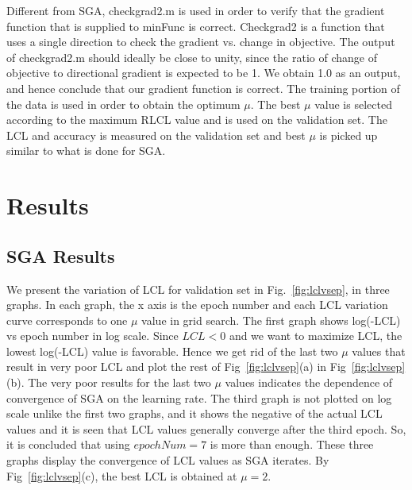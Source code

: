 \documentclass[a4paper]{article}
\begin{document}
Different from SGA, checkgrad2.m \cite{Label5} is used in order to verify that the gradient function that is supplied to minFunc is correct. Checkgrad2 is a function that uses a single direction to check the gradient vs. change in objective. The output of checkgrad2.m should ideally be close to unity, since the ratio of change of objective to directional gradient is expected to be 1. We obtain 1.0 as an output, and hence conclude that our gradient function is correct. The training portion of the data is used in order to obtain the optimum $\mu$. The best $\mu$ value is selected according to the maximum RLCL value and is used on the validation set. The LCL and accuracy is measured on the validation set and best $\mu$ is picked up similar to what is done for SGA.

\section{Results}

\subsection{SGA Results}

We present the variation of LCL for validation set in Fig.~\ref{fig:lclvsep}, in three graphs. In each graph, the x axis is the epoch number and each LCL variation curve corresponds to one $\mu$ value in grid search. The first graph shows log(-LCL) vs epoch number in log scale. Since $LCL < 0$ and we want to maximize LCL, the lowest log(-LCL) value is favorable. Hence we get rid of the last two $\mu$ values that result in very poor LCL and plot the rest of Fig~\ref{fig:lclvsep}(a) in Fig~\ref{fig:lclvsep}(b). The very poor results for the last two $\mu$ values indicates the dependence of convergence of SGA on the learning rate. The third graph is not plotted on log scale unlike the first two graphs, and it shows the negative of the actual LCL values and it is seen that LCL values generally converge after the third epoch. So, it is concluded that using $epochNum = 7$ is more than enough. These three graphs display the convergence of LCL values as SGA iterates. By Fig~\ref{fig:lclvsep}(c), the best LCL is obtained at $\mu = 2$.\\
\end{document}
